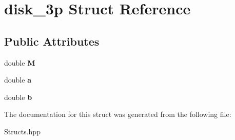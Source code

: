 \hypertarget{structdisk__3p}{}\section{disk\+\_\+3p Struct Reference}
\label{structdisk__3p}
\subsection*{Public Attributes}
\begin{DoxyCompactItemize}
\item 
\mbox{\label{structdisk__3p_a174f7ed754acf7215bf1f23a3f7850f6}} 
double {\bfseries M}
\item 
\mbox{\label{structdisk__3p_a99935aa770118ca0dc121fd64fddb413}} 
double {\bfseries a}
\item 
\mbox{\label{structdisk__3p_a70dd27fdb6fee354643cb4b5b26a089d}} 
double {\bfseries b}
\end{DoxyCompactItemize}


The documentation for this struct was generated from the following file\+:\begin{DoxyCompactItemize}
\item 
Structs.\+hpp\end{DoxyCompactItemize}
